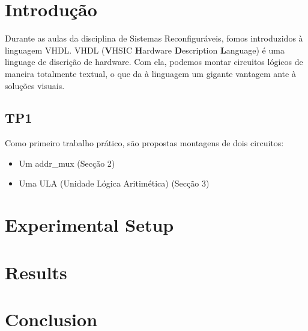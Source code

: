 \documentclass{article}
\begin{document}


\newpage
\thispagestyle{empty}
\tableofcontents
\newpage

\section{Introdução}
Durante as aulas da disciplina de Sistemas Reconfiguráveis, fomos introduzidos à linguagem VHDL. VHDL (\textbf{V}HSIC \textbf{H}ardware \textbf{D}escription \textbf{L}anguage) é uma linguage de discrição de hardware. Com ela, podemos montar circuitos lógicos de maneira totalmente textual, o que da à linguagem um gigante vantagem ante à soluções visuais.

\subsection{TP1}
Como primeiro trabalho prático, são propostas montagens de dois circuitos:

\begin{itemize}
    \item Um addr\_mux (Secção 2)
    \item Uma ULA (Unidade Lógica Aritimética) (Secção 3)
\end{itemize}

\section{Experimental Setup}
\lipsum[2]

\section{Results}
\lipsum[3]

\section{Conclusion}
\lipsum[4]
\end{document}

